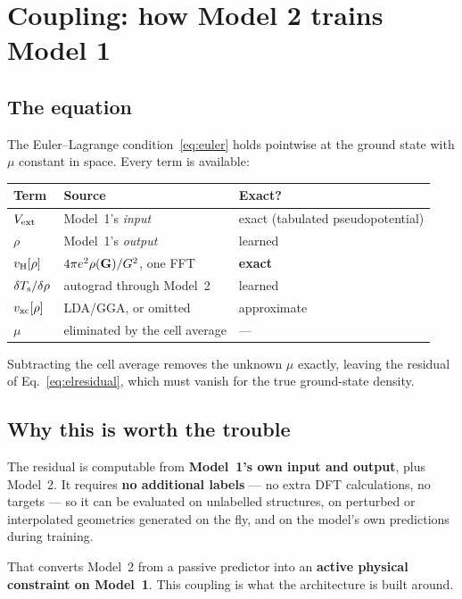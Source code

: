 \section{Coupling: how Model 2 trains Model 1}

\subsection{The equation}

The Euler--Lagrange condition~\eqref{eq:euler} holds pointwise at the ground
state with $\mu$ constant in space. Every term is available:

\begin{center}
\begin{tabular}{@{}lll@{}}
\toprule
Term & Source & Exact? \\
\midrule
$V_{\mathrm{ext}}$ & Model~1's \emph{input} & exact (tabulated pseudopotential) \\
$\rho$ & Model~1's \emph{output} & learned \\
$v_{\mathrm{H}}[\rho]$ & $4\pi e^2\rho(\mathbf{G})/G^2$, one FFT & \textbf{exact} \\
$\delta T_{\mathrm{s}}/\delta\rho$ & autograd through Model~2 & learned \\
$v_{\mathrm{xc}}[\rho]$ & LDA/GGA, or omitted & approximate \\
$\mu$ & eliminated by the cell average & --- \\
\bottomrule
\end{tabular}
\end{center}

Subtracting the cell average removes the unknown $\mu$ exactly, leaving the
residual of Eq.~\eqref{eq:elresidual}, which must vanish for the true
ground-state density.

\subsection{Why this is worth the trouble}

The residual is computable from \textbf{Model~1's own input and output}, plus
Model~2. It requires \textbf{no additional labels} --- no extra DFT
calculations, no targets --- so it can be evaluated on unlabelled structures,
on perturbed or interpolated geometries generated on the fly, and on the
model's own predictions during training.

That converts Model~2 from a passive predictor into an \textbf{active physical
constraint on Model~1}. This coupling is what the architecture is built around.

